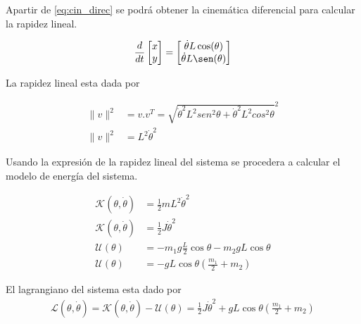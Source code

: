 \documentclass[a4paper]{IEEEtran} %
\begin{document}
Apartir de \ref{eq:cin_direc} se podrá obtener la cinemática diferencial para calcular la rapidez lineal.

\begin{equation}
    \frac{d}{dt}\begin{bmatrix}
        x \\
        y \\
    \end{bmatrix}=
    \begin{bmatrix}
        \dot{\theta}L\cos(\theta)  \\
        \dot{\theta}L\sen(\theta)  \\
    \end{bmatrix}
    \label{eq:speed}
\end{equation}

La rapidez lineal esta dada por

\begin{equation}
    \begin{split}
        \|v\|^2&=v.v^T=\sqrt{\dot{\theta}^2L^2sen^2{\theta}+\dot{\theta}^2L^2cos^2{\theta}}^2\\
        \|v\|^2&=L^2\dot{\theta}^2
    \end{split}
    \label{eq:speed_mod}
\end{equation}

Usando la expresión de la rapidez lineal del sistema se procedera a calcular el modelo de energía del sistema.

\begin{equation}
    \begin{split}
        \mathcal{K}(\theta,\dot{\theta}) &= \frac{1}{2}mL^2\dot\theta^2\\
        \mathcal{K}(\theta,\dot{\theta}) &= \frac{1}{2}J\dot\theta^2\\
        \mathcal{U}(\theta) &=  -m_1g\frac{L}{2}\cos{\theta} -m_2gL\cos{\theta} \\
        \mathcal{U}(\theta) &= -gL\cos{\theta(\frac{m_1}{2}+m_2)}
    \end{split}
    \label{eq:energy}
\end{equation}

El lagrangiano del sistema esta dado por
\begin{equation}
    \begin{split}
        \mathcal{L}(\theta,\dot{\theta})=\mathcal{K}(\theta,\dot{\theta})-\mathcal{U}(\theta)=\frac{1}{2}J\dot{\theta}^2+gL\cos{\theta}(\frac{m_1}{2}+m_2)
    \end{split}
    \label{eq:lagrange}
\end{equation}
\end{document}
